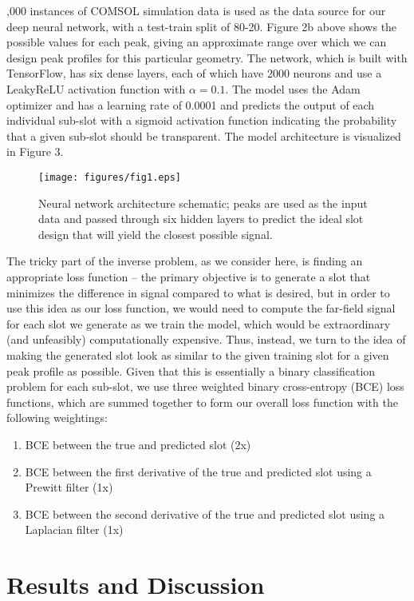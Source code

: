 \documentclass[11pt]{article}
\begin{document}
,000 instances of COMSOL simulation data is used as the data source for our deep neural network, with a test-train split of 80-20. Figure 2b above shows the possible values for each peak, giving an approximate range over which we can design peak profiles for this particular geometry. The network, which is built with TensorFlow, has six dense layers, each of which have 2000 neurons and use a LeakyReLU activation function with $\alpha = 0.1$. The model uses the Adam optimizer and has a learning rate of 0.0001 and predicts the output of each individual sub-slot with a sigmoid activation function indicating the probability that a given sub-slot should be transparent. The model architecture is visualized in Figure 3. \\

\begin{figure}[b]
	\centering
	\texttt{[image: figures/fig1.eps]}
	\caption{Neural network architecture schematic; peaks are used as the input data and passed through six hidden layers to predict the ideal slot design that will yield the closest possible signal.}
\end{figure}

\noindent The tricky part of the inverse problem, as we consider here, is finding an appropriate loss function -- the primary objective is to generate a slot that minimizes the difference in signal compared to what is desired, but in order to use this idea as our loss function, we would need to compute the far-field signal for each slot we generate as we train the model, which would be extraordinary (and unfeasibly) computationally expensive. Thus, instead, we turn to the idea of making the generated slot look as similar to the given training slot for a given peak profile as possible. Given that this is essentially a binary classification problem for each sub-slot, we use three weighted binary cross-entropy (BCE) loss functions, which are summed together to form our overall loss function with the following weightings:
\begin{enumerate}
  \item BCE between the true and predicted slot (2x)
  \item BCE between the first derivative of the true and predicted slot using a Prewitt filter (1x)
  \item BCE between the second derivative of the true and predicted slot using a Laplacian filter (1x)
\end{enumerate}

\section*{Results and Discussion}
\end{document}
